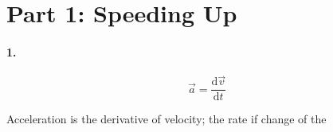 

\usepackage{enumitem}
\usepackage{graphicx}
\graphicspath{ {./lab02images/} }


\renewcommand\assignment{Lab 2: Acceleration and Force, 2/7/2023, Partners: Maite Valentin-Lugo, Seth Waln}



    \iffalse
    \begin{equation*}
        \begin{gathered}
            Equations go here.
        \end{gathered}
    \end{equation*}

    \resizebox{\hsize}{!}{$Long equation goes here$}

    \begin{multicol*}{# of columns}
    \end{multicol*}

    \horizontal

    \fi


    \section*{Part 1: Speeding Up}

    \paragraph*{1.}

    \begin{mdframed}
        \begin{equation}
            \vec{a} = \frac{\mathrm{d}\vec{v}}{\mathrm{d}t}
        \end{equation}

        Acceleration is the derivative of velocity; the rate if change of the 
    \end{mdframed}

